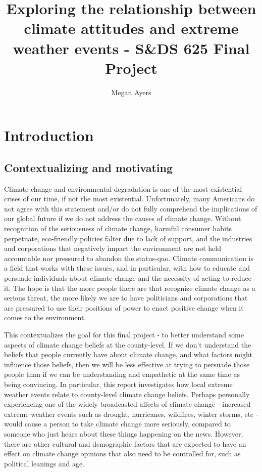 \documentclass{article}
\title{Exploring the relationship between climate attitudes and extreme weather events - S\&DS 625 Final Project}
\author{Megan Ayers}
\begin{document}
\maketitle

\section{Introduction}
\subsection{Contextualizing and motivating}
Climate change and environmental degradation is one of the most existential
crises of our time, if not the most existential. Unfortunately, many
Americans do not agree with this statement and/or do not fully comprehend the
implications of our global future if we do not address the causes of
climate change. Without recognition of the seriousness of climate change,
harmful consumer habits perpetuate, eco-friendly policies falter due to lack
of support, and the industries and corporations that negatively impact the
environment are not held accountable nor pressured to abandon the status-quo.
Climate communication is a field that works with these issues, and in
particular, with how to educate and persuade individuals about climate
change and the necessity of acting to reduce it. The hope is that
the more people there are that recognize climate change as a serious threat,
the more likely we are to have politicians and corporations that are
pressured to use their positions of power to enact positive change when it
comes to the environment. 

This contextualizes the goal for this final project - to better understand
some aspects of climate change beliefs at the county-level. If we don't 
understand the beliefs that people currently have about climate change,
and what factors might influence those beliefs, then we will be less
effective at trying to persuade those people than if we can be understanding
and empathetic at the same time as being convincing. In particular, this
report investigates how local extreme weather events relate to county-level
climate change beliefs. Perhaps personally experiencing one of
the widely broadcasted affects of climate change - increased extreme weather
events such as drought, hurricanes, wildfires, winter storms, etc - would
cause a person to take climate change more seriously, compared to someone
who just hears about these things happening on the news. However, there are
other cultural and demographic factors that are expected to have an effect
on climate change opinions that also need to be controlled for, such as
political leanings and age.
\end{document}
